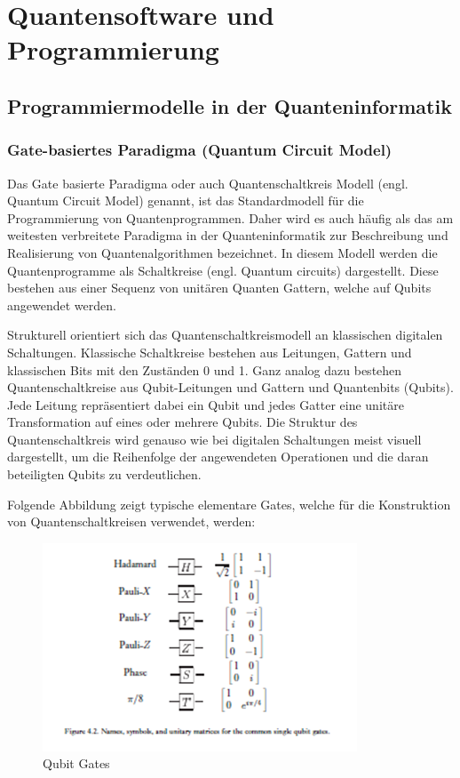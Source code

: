 \chapter{Quantensoftware und Programmierung}
\label{programming} %



\section{Programmiermodelle in der Quanteninformatik}

\subsection{Gate-basiertes Paradigma (Quantum Circuit Model)}
Das Gate basierte Paradigma oder auch Quantenschaltkreis Modell (engl. Quantum Circuit Model) genannt, ist das Standardmodell für die Programmierung von Quantenprogrammen. Daher wird es auch häufig als das am weitesten verbreitete Paradigma in der Quanteninformatik zur Beschreibung und Realisierung von Quantenalgorithmen bezeichnet. In diesem Modell werden die Quantenprogramme als Schaltkreise (engl. Quantum circuits) dargestellt. Diese bestehen aus einer Sequenz von unitären Quanten Gattern, welche auf Qubits angewendet werden. 

Strukturell orientiert sich das Quantenschaltkreismodell an klassischen digitalen Schaltungen. Klassische Schaltkreise bestehen aus Leitungen, Gattern und klassischen Bits mit den Zuständen 0 und 1. Ganz analog dazu bestehen Quantenschaltkreise aus Qubit-Leitungen und Gattern und Quantenbits (Qubits). Jede Leitung repräsentiert dabei ein Qubit und jedes Gatter eine unitäre Transformation auf eines oder mehrere Qubits. Die Struktur des Quantenschaltkreis wird genauso wie bei digitalen Schaltungen meist visuell dargestellt, um die Reihenfolge der angewendeten Operationen und die daran beteiligten Qubits zu verdeutlichen. 

Folgende Abbildung zeigt typische elementare Gates, welche für die Konstruktion von Quantenschaltkreisen verwendet, werden: 
\begin{figure}
    \centering
    \includegraphics[width=0.5\linewidth]{Qubit Gates.png}
    \caption{Qubit Gates}
    \label{fig:enter-label}
\end{figure}

